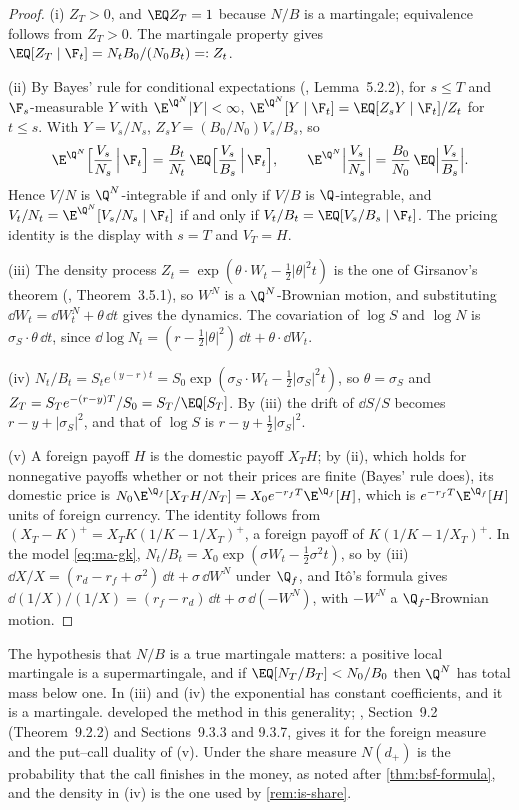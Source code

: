 \begin{proof}
(i) $Z_T>0$, and $\EQ Z_T=1$ because $N/B$ is a martingale; equivalence follows from
$Z_T>0$. The martingale property gives $\EQ[Z_T\mid\F_t]=N_tB_0/(N_0B_t)=:Z_t$.

(ii) By Bayes' rule for conditional expectations (\textcite{shreve2}, Lemma~5.2.2), for $s\le T$
and $\F_s$-measurable $Y$ with $\E^{\Q^N}|Y|<\infty$,
$\E^{\Q^N}[Y\mid\F_t]=\EQ[Z_sY\mid\F_t]/Z_t$ for $t\le s$. With $Y=V_s/N_s$, $Z_sY=(B_0/N_0)V_s/B_s$, so
\[
  \E^{\Q^N}\Big[\frac{V_s}{N_s}\,\Big|\,\F_t\Big]=\frac{B_t}{N_t}\,\EQ\Big[\frac{V_s}{B_s}\,\Big|\,\F_t\Big],
  \qquad \E^{\Q^N}\Big|\frac{V_s}{N_s}\Big|=\frac{B_0}{N_0}\,\EQ\Big|\frac{V_s}{B_s}\Big| .
\]
Hence $V/N$ is $\Q^N$-integrable if and only if $V/B$ is $\Q$-integrable, and
$V_t/N_t=\E^{\Q^N}[V_s/N_s\mid\F_t]$ if and only if $V_t/B_t=\EQ[V_s/B_s\mid\F_t]$. The pricing
identity is the display with $s=T$ and $V_T=H$.

(iii) The density process $Z_t=\exp(\theta\cdot W_t-\frac12|\theta|^2t)$ is the one of
Girsanov's theorem (\textcite{karatzas-shreve}, Theorem~3.5.1), so $W^N$ is a $\Q^N$-Brownian
motion, and substituting $\dd W_t=\dd W^N_t+\theta\,\dd t$ gives the dynamics. The covariation of
$\log S$ and $\log N$ is $\sigma_S\cdot\theta\,\dd t$, since $\dd\log N_t=(r-\frac12|\theta|^2)\,\dd t+\theta\cdot\dd W_t$.

(iv) $N_t/B_t=S_te^{(y-r)t}=S_0\exp(\sigma_S\cdot W_t-\frac12|\sigma_S|^2t)$, so $\theta=\sigma_S$
and $Z_T=S_Te^{-(r-y)T}/S_0=S_T/\EQ[S_T]$. By (iii) the drift of $\dd S/S$ becomes
$r-y+|\sigma_S|^2$, and that of $\log S$ is $r-y+\frac12|\sigma_S|^2$.

(v) A foreign payoff $H$ is the domestic payoff $X_TH$; by (ii), which holds for nonnegative payoffs
whether or not their prices are finite (Bayes' rule does), its domestic price is
$N_0\E^{\Q_f}[X_TH/N_T]=X_0e^{-r_fT}\E^{\Q_f}[H]$, which is $e^{-r_fT}\E^{\Q_f}[H]$ units of foreign
currency. The identity follows from $(X_T-K)^+=X_TK(1/K-1/X_T)^+$, a foreign payoff of
$K(1/K-1/X_T)^+$. In the model \eqref{eq:ma-gk}, $N_t/B_t=X_0\exp(\sigma W_t-\frac12\sigma^2t)$, so by
(iii) $\dd X/X=(r_d-r_f+\sigma^2)\,\dd t+\sigma\,\dd W^N$ under $\Q_f$, and It\^o's formula gives
$\dd(1/X)/(1/X)=(r_f-r_d)\,\dd t+\sigma\,\dd(-W^N)$, with $-W^N$ a $\Q_f$-Brownian motion.
\end{proof}

The hypothesis that $N/B$ is a true martingale matters: a positive local martingale is a
supermartingale, and if $\EQ[N_T/B_T]<N_0/B_0$ then $\Q^N$ has total mass below one. In (iii)
and (iv) the exponential has constant coefficients, and it is a martingale.
\textcite{geman-elkaroui-rochet} developed the method in this generality; \textcite{shreve2},
Section~9.2 (Theorem~9.2.2) and Sections~9.3.3 and 9.3.7, gives it for the foreign measure and the
put--call duality of (v). Under the share measure $N(d_+)$ is the probability that the call
finishes in the money, as noted after \cref{thm:bsf-formula}, and the density in (iv) is the one used by
\cref{rem:is-share}.

